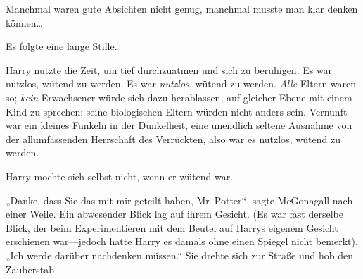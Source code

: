 Manchmal waren gute Absichten nicht genug, manchmal musste man klar denken können…

Es folgte eine lange Stille.

Harry nutzte die Zeit, um tief durchzuatmen und sich zu beruhigen. Es war nutzlos, wütend zu werden. Es war \emph{nutzlos}, wütend zu werden. \emph{Alle} Eltern waren so; \emph{kein} Erwachsener würde sich dazu herablassen, auf gleicher Ebene mit einem Kind zu sprechen; seine biologischen Eltern würden nicht anders sein. Vernunft war ein kleines Funkeln in der Dunkelheit, eine unendlich seltene Ausnahme von der allumfassenden Herrschaft des Verrückten, also war es nutzlos, wütend zu werden.

Harry mochte sich selbst nicht, wenn er wütend war.

„Danke, dass Sie das mit mir geteilt haben, Mr~Potter“, sagte McGonagall nach einer Weile. Ein abwesender Blick lag auf ihrem Gesicht. (Es war fast derselbe Blick, der beim Experimentieren mit dem Beutel auf Harrys eigenem Gesicht erschienen war—jedoch hatte Harry es damals ohne einen Spiegel nicht bemerkt). „Ich werde darüber nachdenken müssen.“ Sie drehte sich zur Straße und hob den Zauberstab—

